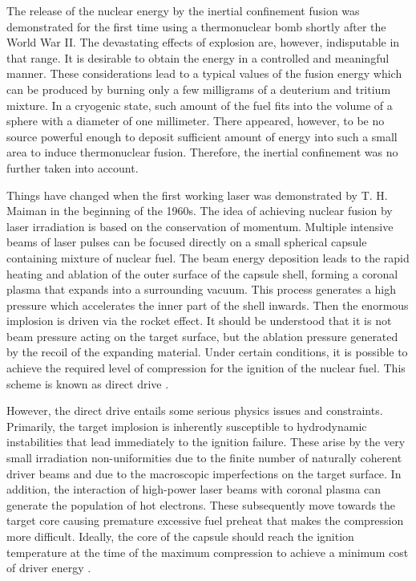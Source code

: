 The release of the nuclear energy by the inertial confinement fusion was demonstrated for the first time using a thermonuclear bomb shortly after the World War II. The devastating effects of explosion are, however, indisputable in that range. It is desirable to obtain the energy in a controlled and meaningful manner. These considerations lead to a typical values of the fusion energy which can be produced by burning only a few milligrams of a deuterium and tritium mixture. In a cryogenic state, such amount of the fuel fits into the volume of a sphere with a diameter of one millimeter. There appeared, however, to be no source powerful enough to deposit sufficient amount of energy into such a small area to induce thermonuclear fusion. Therefore, the inertial confinement was no further taken into account.

Things have changed when the first working laser was demonstrated by T. H. Maiman in the beginning of the 1960s. The idea of achieving nuclear fusion by laser irradiation is based on the conservation of momentum. Multiple intensive beams of laser pulses can be focused directly on a small spherical capsule containing mixture of nuclear fuel. The beam energy deposition leads to the rapid heating and ablation of the outer surface of the capsule shell, forming a coronal plasma that expands into a surrounding vacuum. This process generates a high pressure which accelerates the inner part of the shell inwards. Then the enormous implosion is driven via the rocket effect. It should be understood that it is not beam pressure acting on the target surface, but the ablation pressure generated by the recoil of the expanding material. Under certain conditions, it is possible to achieve the required level of compression for the ignition of the nuclear fuel. This scheme is known as direct drive \cite{basko}.

However, the direct drive entails some serious physics issues and constraints. Primarily, the target implosion is inherently susceptible to hydrodynamic instabilities that lead immediately to the ignition failure. These arise by the very small irradiation non-uniformities due to the finite number of naturally coherent driver beams and due to the macroscopic imperfections on the target surface. In addition, the interaction of high-power laser beams with coronal plasma can generate the population of hot electrons. These subsequently move towards the target core causing premature excessive fuel preheat that makes the compression more difficult. Ideally, the core of the capsule should reach the ignition temperature at the time of the maximum compression to achieve a minimum cost of driver energy \cite{atzeni}.

